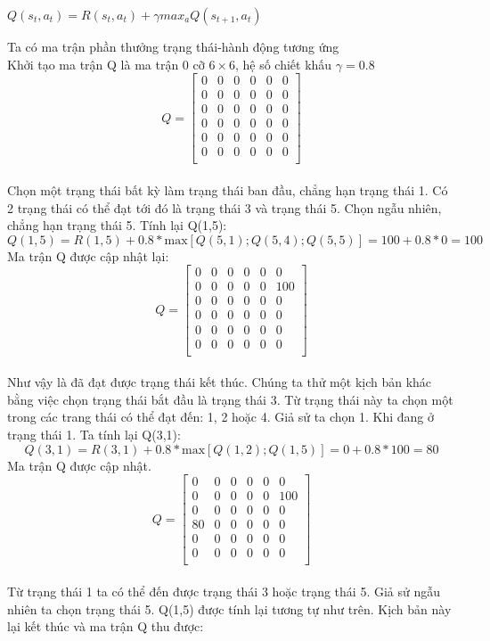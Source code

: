 \documentclass[14pt,a4paper,oneside]{report}		%
\begin{document}
\begin{center}
$Q(s_t,a_t) = R(s_t,a_t)+\gamma max_aQ(s_{t+1},a_t)$\\
\end{center}
Ta có ma trận phần thưởng trạng thái-hành động tương ứng\\
Khởi tạo ma trận Q là ma trận 0 cỡ $6 \times 6$, hệ số chiết khấu $\gamma = 0.8$\\
$$Q=\begin{bmatrix}
0&0&0&0&0&0\\
0&0&0&0&0&0\\
0&0&0&0&0&0\\
0&0&0&0&0&0\\
0&0&0&0&0&0\\
0&0&0&0&0&0\\
\end{bmatrix}$$\\
Chọn một trạng thái bất kỳ làm trạng thái ban đầu, chẳng hạn  trạng thái 1. Có 2 trạng thái có thể đạt tới đó là trạng thái 3 và trạng thái 5. Chọn ngẫu nhiên, chẳng hạn trạng thái 5. Tính lại Q(1,5):
$$Q(1,5)=R(1,5)+0.8*\text{max}[{Q(5,1);Q(5,4);Q(5,5)}]=100+0.8*0=100$$
Ma trận Q được cập nhật lại:
$$Q=\begin{bmatrix}
0&0&0&0&0&0\\
0&0&0&0&0&100\\
0&0&0&0&0&0\\
0&0&0&0&0&0\\
0&0&0&0&0&0\\
0&0&0&0&0&0\\
\end{bmatrix}$$\\
Như vậy là đã đạt được trạng thái kết thúc. Chúng ta thử một  kịch bản khác bằng việc chọn trạng thái bắt đầu là trạng thái 3. Từ trạng thái này ta chọn một trong các trang thái có thể đạt đến: 1, 2 hoặc 4. Giả sử ta chọn 1. Khi đang ở trạng thái 1. Ta tính lại Q(3,1):
$$Q(3,1)=R(3,1)+0.8*\text{max}[{Q(1,2);Q(1,5)}]=0+0.8*100=80$$
Ma trận Q được cập nhật.
$$Q=\begin{bmatrix}
0&0&0&0&0&0\\
0&0&0&0&0&100\\
0&0&0&0&0&0\\
80&0&0&0&0&0\\
0&0&0&0&0&0\\
0&0&0&0&0&0\\
\end{bmatrix}$$\\
Từ trạng thái 1 ta có thể đến được trạng thái 3 hoặc trạng thái 5. Giả sử ngẫu nhiên ta chọn trạng thái 5. Q(1,5) được tính lại tương tự như trên. Kịch bản này lại kết thúc và ma trận Q thu được:
\end{document}
